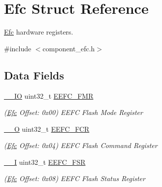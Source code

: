 \hypertarget{structEfc}{}\section{Efc Struct Reference}
\label{structEfc}


\mbox{\hyperlink{structEfc}{Efc}} hardware registers.  




{\ttfamily \#include $<$component\+\_\+efc.\+h$>$}

\subsection*{Data Fields}
\begin{DoxyCompactItemize}
\item 
\mbox{\label{structEfc_a0267dc569c60c29fd05b2cc8b7ee112c}} 
\mbox{\hyperlink{core__cm7_8h_aec43007d9998a0a0e01faede4133d6be}{\+\_\+\+\_\+\+IO}} uint32\+\_\+t \mbox{\hyperlink{structEfc_a0267dc569c60c29fd05b2cc8b7ee112c}{E\+E\+F\+C\+\_\+\+F\+MR}}
\begin{DoxyCompactList}\small\item\em (\mbox{\hyperlink{structEfc}{Efc}} Offset\+: 0x00) E\+E\+FC Flash Mode Register \end{DoxyCompactList}\item 
\mbox{\label{structEfc_a38dbb840f7e6d6d6636470906c77d2dd}} 
\mbox{\hyperlink{core__cm7_8h_a7e25d9380f9ef903923964322e71f2f6}{\+\_\+\+\_\+O}} uint32\+\_\+t \mbox{\hyperlink{structEfc_a38dbb840f7e6d6d6636470906c77d2dd}{E\+E\+F\+C\+\_\+\+F\+CR}}
\begin{DoxyCompactList}\small\item\em (\mbox{\hyperlink{structEfc}{Efc}} Offset\+: 0x04) E\+E\+FC Flash Command Register \end{DoxyCompactList}\item 
\mbox{\label{structEfc_aaf6b92c6ac0bdc78197ca0a16d37fdb0}} 
\mbox{\hyperlink{core__cm7_8h_af63697ed9952cc71e1225efe205f6cd3}{\+\_\+\+\_\+I}} uint32\+\_\+t \mbox{\hyperlink{structEfc_aaf6b92c6ac0bdc78197ca0a16d37fdb0}{E\+E\+F\+C\+\_\+\+F\+SR}}
\begin{DoxyCompactList}\small\item\em (\mbox{\hyperlink{structEfc}{Efc}} Offset\+: 0x08) E\+E\+FC Flash Status Register \end{DoxyCompactList}\item 

\end{DoxyCompactItemize}
